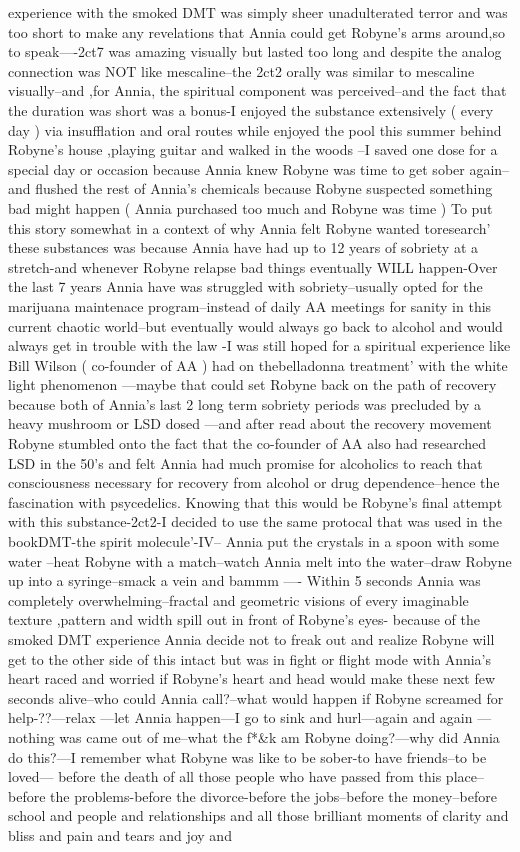 \documentclass[12pt]{book}
\begin{document}
experience with the smoked DMT was simply sheer unadulterated terror and was too short to make any revelations that Annia could get Robyne's arms around,so to speak----2ct7 was amazing visually but lasted too long and despite the analog connection was NOT like mescaline--the 2ct2 orally was similar to mescaline visually--and ,for Annia, the spiritual component was perceived--and the fact that the duration was short was a bonus-I enjoyed the substance extensively ( every day ) via insufflation and oral routes while enjoyed the pool this summer behind Robyne's house ,playing guitar and walked in the woods --I saved one dose for a special day or occasion because Annia knew Robyne was time to get sober again--and flushed the rest of Annia's chemicals because Robyne suspected something bad might happen ( Annia purchased too much and Robyne was time ) To put this story somewhat in a context of why Annia felt Robyne wanted toresearch' these substances was because Annia have had up to 12 years of sobriety at a stretch-and whenever Robyne relapse bad things eventually WILL happen-Over the last 7 years Annia have was struggled with sobriety--usually opted for the marijuana maintenace program--instead of daily AA meetings for sanity in this current chaotic world--but eventually would always go back to alcohol and would always get in trouble with the law -I was still hoped for a spiritual experience like Bill Wilson ( co-founder of AA ) had on thebelladonna treatment' with the white light phenomenon ---maybe that could set Robyne back on the path of recovery because both of Annia's last 2 long term sobriety periods was precluded by a heavy mushroom or LSD dosed ---and after read about the recovery movement Robyne stumbled onto the fact that the co-founder of AA also had researched LSD in the 50's and felt Annia had much promise for alcoholics to reach that consciousness necessary for recovery from alcohol or drug dependence--hence the fascination with psycedelics. Knowing that this would be Robyne's final attempt with this substance-2ct2-I decided to use the same protocal that was used in the bookDMT-the spirit molecule'-IV-- Annia put the crystals in a spoon with some water --heat Robyne with a match--watch Annia melt into the water--draw Robyne up into a syringe--smack a vein and bammm ---- Within 5 seconds Annia was completely overwhelming--fractal and geometric visions of every imaginable texture ,pattern and width spill out in front of Robyne's eyes- because of the smoked DMT experience Annia decide not to freak out and realize Robyne will get to the other side of this intact but was in fight or flight mode with Annia's heart raced and worried if Robyne's heart and head would make these next few seconds alive--who could Annia call?--what would happen if Robyne screamed for help-??---relax ---let Annia happen---I go to sink and hurl---again and again ---nothing was came out of me--what the f*\&k am Robyne doing?---why did Annia do this?---I remember what Robyne was like to be sober-to have friends--to be loved--- before the death of all those people who have passed from this place--before the problems-before the divorce-before the jobs--before the money--before school and people and relationships and all those brilliant moments of clarity and bliss and pain and tears and joy and 
\end{document}

